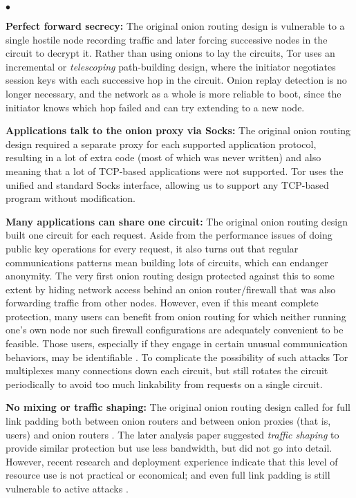 \documentclass[times,10pt,twocolumn]{article}
\newenvironment{tightlist}{\begin{list}{$\bullet$}{
  \setlength{\itemsep}{0mm}
    \setlength{\parsep}{0mm}
    }}{\end{list}}
\begin{document}
\begin{tightlist}

\item \textbf{Perfect forward secrecy:} The original onion routing
design is vulnerable to a single hostile node recording traffic and later
forcing successive nodes in the circuit to decrypt it. Rather than using
onions to lay the circuits, Tor uses an incremental or \emph{telescoping}
path-building design, where the initiator negotiates session keys with
each successive hop in the circuit. Onion replay detection is no longer
necessary, and the network as a whole is more reliable to boot, since
the initiator knows which hop failed and can try extending to a new node.

\item \textbf{Applications talk to the onion proxy via Socks:}
The original onion routing design required a separate proxy for each
supported application protocol, resulting in a lot of extra code (most
of which was never written) and also meaning that a lot of TCP-based
applications were not supported. Tor uses the unified and standard Socks
\cite{socks4,socks5} interface, allowing us to support any TCP-based
program without modification.

\item \textbf{Many applications can share one circuit:} The original
onion routing design built one circuit for each request. Aside from the
performance issues of doing public key operations for every request, it
also turns out that regular communications patterns mean building lots
of circuits, which can endanger anonymity.
The very first onion routing design \cite{or-ih96} protected against
this to some extent by hiding network access behind an onion
router/firewall that was also forwarding traffic from other nodes.
However, even if this meant complete protection, many users can
benefit from onion routing for which neither running one's own node
nor such firewall configurations are adequately convenient to be
feasible. Those users, especially if they engage in certain unusual
communication behaviors, may be identifiable \cite{wright03}. To
complicate the possibility of such attacks Tor multiplexes many
connections down each circuit, but still rotates the circuit
periodically to avoid too much linkability from requests on a single
circuit.

\item \textbf{No mixing or traffic shaping:} The original onion routing
design called for full link padding both between onion routers and between
onion proxies (that is, users) and onion routers \cite{or-jsac98}. The
later analysis paper \cite{or-pet00} suggested \emph{traffic shaping}
to provide similar protection but use less bandwidth, but did not go
into detail. However, recent research \cite{econymics} and deployment
experience \cite{freedom21-security} indicate that this level of resource
use is not practical or economical; and even full link padding is still
vulnerable to active attacks \cite{defensive-dropping}.


\end{tightlist}
\end{document}
